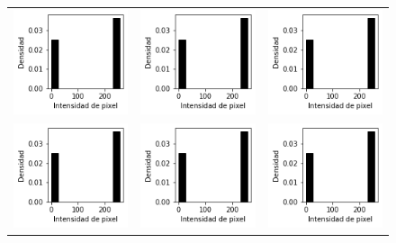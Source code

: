 \begin{figure}[!h]
\begin{tabular}{ccc}
        \includegraphics[width=4cm]{../Plots/THR/threshold_output_6.png} &
        \includegraphics[width=4cm]{../Plots/THR/threshold_output_7.png} &
        \includegraphics[width=4cm]{../Plots/THR/threshold_output_8.png} \\

        \includegraphics[width=4cm]{../Plots/THR/threshold_output_9.png} &
        \includegraphics[width=4cm]{../Plots/THR/threshold_output_10.png} &
        \includegraphics[width=4cm]{../Plots/THR/threshold_output_11.png} \\


\end{tabular}
\end{figure}
